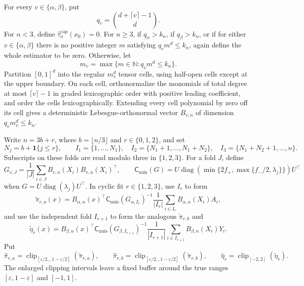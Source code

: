 For every \(v\in\{\alpha,\beta\}\), put
\[
q_v=\binom{d+\lceil v\rceil-1}{d}.
\]
For \(n<3\), define \(\widehat\tau_n^{\mathrm{cap}}(x_0)=0\).  For
\(n\geq3\), if \(q_\alpha>k_n\), if \(q_\beta>k_n\), or if for either
\(v\in\{\alpha,\beta\}\) there is no positive integer \(m\) satisfying
\(q_vm^d\leq k_n\), again define the whole estimator to be zero.  Otherwise,
let
\[
m_v=\max\{m\in\mathbb N:q_vm^d\leq k_n\}.
\]
Partition \([0,1]^d\) into the regular \(m_v^d\) tensor cells, using
half-open cells except at the upper boundary.  On each cell, orthonormalize
the monomials of total degree at most \(\lceil v\rceil-1\) in graded
lexicographic order with positive leading coefficient, and order the cells
lexicographically.  Extending every cell polynomial by zero off its cell
gives a deterministic Lebesgue-orthonormal vector \(B_{v,n}\) of dimension
\(q_vm_v^d\leq k_n\).

Write \(n=3b+r\), where \(b=\lfloor n/3\rfloor\) and
\(r\in\{0,1,2\}\), and set
\[
N_j=b+\mathbf 1\{j\leq r\},\qquad
I_1=\{1,\ldots,N_1\},\quad
I_2=\{N_1+1,\ldots,N_1+N_2\},\quad
I_3=\{N_1+N_2+1,\ldots,n\}.
\]
Subscripts on these folds are read modulo three in \(\{1,2,3\}\).  For a
fold \(J\), define
\[
G_{v,J}=\frac1{|J|}\sum_{i\in J}B_{v,n}(X_i)B_{v,n}(X_i)^\top,
\qquad
\mathsf C_{\mathrm{nuis}}(G)
=U\operatorname{diag}\!\left(
\min\{2f_+,\max\{f_-/2,\lambda_j\}\}
\right)U^\top
\]
when \(G=U\operatorname{diag}(\lambda_j)U^\top\).  In cyclic fit
\(r\in\{1,2,3\}\), use \(I_r\) to form
\[
\widetilde\pi_{r,a}(x)=B_{\alpha,n}(x)^\top
\mathsf C_{\mathrm{nuis}}(G_{\alpha,I_r})^{-1}
\frac1{|I_r|}\sum_{i\in I_r}B_{\alpha,n}(X_i)A_i,
\]
and use the independent fold \(I_{r+1}\) to form the analogous
\(\widetilde\pi_{r,b}\) and
\[
\widetilde\eta_r(x)=B_{\beta,n}(x)^\top
\mathsf C_{\mathrm{nuis}}(G_{\beta,I_{r+1}})^{-1}
\frac1{|I_{r+1}|}\sum_{i\in I_{r+1}}B_{\beta,n}(X_i)Y_i.
\]
Put
\[
\widehat\pi_{r,a}=\operatorname{clip}_{[\varepsilon/2,,1-\varepsilon/2]}
(\widetilde\pi_{r,a}),\qquad
\widehat\pi_{r,b}=\operatorname{clip}_{[\varepsilon/2,,1-\varepsilon/2]}
(\widetilde\pi_{r,b}),\qquad
\widehat\eta_r=\operatorname{clip}_{[-2,2]}(\widetilde\eta_r).
\]
The enlarged clipping intervals leave a fixed buffer around the true ranges
\([\varepsilon,1-\varepsilon]\) and \([-1,1]\).

